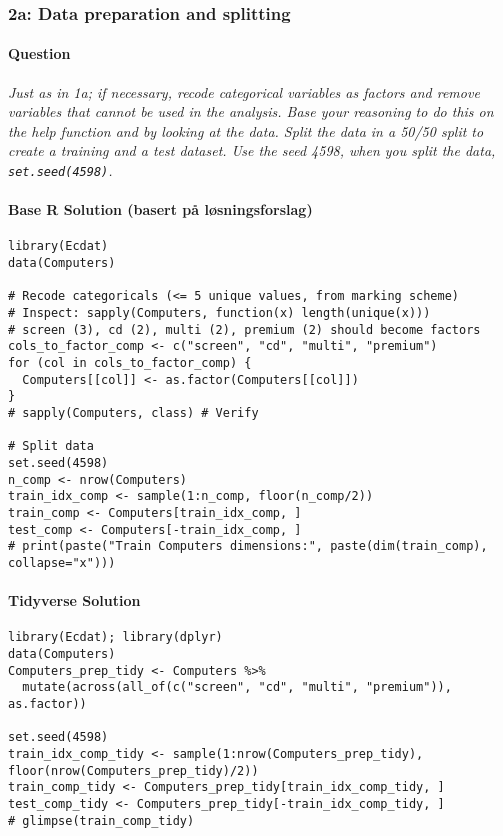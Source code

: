 \documentclass[12pt,a4paper]{article}
\newcommand{\Rcode}[1]{\texttt{#1}} %
\begin{document}
    \subsubsection{2a: Data preparation and splitting}
        \paragraph{Question}
        \textit{Just as in 1a; if necessary, recode categorical variables as factors and remove variables that cannot be used in the analysis. Base your reasoning to do this on the help function and by looking at the data. Split the data in a 50/50 split to create a training and a test dataset. Use the seed 4598, when you split the data, \Rcode{set.seed(4598)}.}
        \paragraph{Base R Solution (basert på løsningsforslag)}
\begin{lstlisting}[]
library(Ecdat)
data(Computers)

# Recode categoricals (<= 5 unique values, from marking scheme)
# Inspect: sapply(Computers, function(x) length(unique(x)))
# screen (3), cd (2), multi (2), premium (2) should become factors
cols_to_factor_comp <- c("screen", "cd", "multi", "premium")
for (col in cols_to_factor_comp) {
  Computers[[col]] <- as.factor(Computers[[col]])
}
# sapply(Computers, class) # Verify

# Split data
set.seed(4598)
n_comp <- nrow(Computers)
train_idx_comp <- sample(1:n_comp, floor(n_comp/2))
train_comp <- Computers[train_idx_comp, ]
test_comp <- Computers[-train_idx_comp, ]
# print(paste("Train Computers dimensions:", paste(dim(train_comp), collapse="x")))
\end{lstlisting}
        \paragraph{Tidyverse Solution}
\begin{lstlisting}
library(Ecdat); library(dplyr)
data(Computers)
Computers_prep_tidy <- Computers %>%
  mutate(across(all_of(c("screen", "cd", "multi", "premium")), as.factor))

set.seed(4598)
train_idx_comp_tidy <- sample(1:nrow(Computers_prep_tidy), floor(nrow(Computers_prep_tidy)/2))
train_comp_tidy <- Computers_prep_tidy[train_idx_comp_tidy, ]
test_comp_tidy <- Computers_prep_tidy[-train_idx_comp_tidy, ]
# glimpse(train_comp_tidy)
\end{lstlisting}
\end{document}
